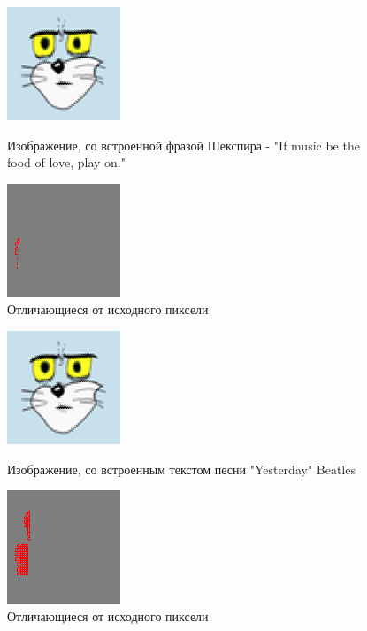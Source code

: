 \documentclass[a4paper]{article}
\begin{document}
  \begin{figure}[H]
    \centering
    \begin{minipage}[t]{0.4\textwidth}
        \centering
        \includegraphics{stego_1}
        \caption{Изображение, со встроенной фразой Шекспира - "If music be the food of love, play on."}
    \end{minipage}
    \hfill
    \begin{minipage}[t]{0.4\textwidth}
        \centering
        \includegraphics{diff_1}
        \caption{Отличающиеся от исходного пиксели} 
    \end{minipage}
  \end{figure}
  
  \begin{figure}[H]
    \centering
    \begin{minipage}[t]{0.4\textwidth}
        \centering
        \includegraphics{stego_2}
        \caption{Изображение, со встроенным текстом песни "Yesterday" Beatles}
    \end{minipage}
    \hfill
    \begin{minipage}[t]{0.4\textwidth}
        \centering
        \includegraphics{diff_2}
        \caption{Отличающиеся от исходного пиксели} 
    \end{minipage}
  \end{figure}
  
\end{document}
